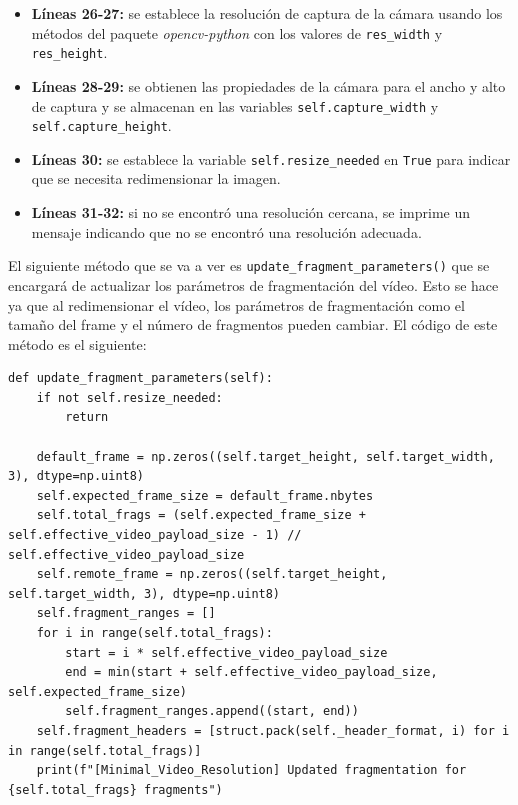 \begin{itemize}
    \item \textbf{Líneas 26-27:} se establece la resolución de captura de la cámara usando los métodos del paquete \textit{opencv-python} con los valores de \texttt{res\_width} y \texttt{res\_height}.
    \item \textbf{Líneas 28-29:} se obtienen las propiedades de la cámara para el ancho y alto de captura y se almacenan en las variables \texttt{self.capture\_width} y \texttt{self.capture\_height}.
    \item \textbf{Líneas 30:} se establece la variable \texttt{self.resize\_needed} en \texttt{True} para indicar que se necesita redimensionar la imagen.
    \item \textbf{Líneas 31-32:} si no se encontró una resolución cercana, se imprime un mensaje indicando que no se encontró una resolución adecuada.
\end{itemize}
\vspace{\baselineskip}

El siguiente método que se va a ver es \texttt{update\_fragment\_parameters()} que se encargará de actualizar los parámetros de fragmentación del vídeo. Esto se hace ya que al redimensionar el vídeo, los parámetros de fragmentación como el tamaño del frame y el número de fragmentos pueden cambiar. El código de este método es el siguiente:
\begin{lstlisting}[style=pythonstyle, caption={Método \texttt{update\_fragment\_parameters()} de \textit{Minimal\_Video\_Resolution}.}, label={lst:update_fragment_parameters_minimal_video_resolution}]
def update_fragment_parameters(self):
    if not self.resize_needed:
        return

    default_frame = np.zeros((self.target_height, self.target_width, 3), dtype=np.uint8)
    self.expected_frame_size = default_frame.nbytes
    self.total_frags = (self.expected_frame_size + self.effective_video_payload_size - 1) // self.effective_video_payload_size
    self.remote_frame = np.zeros((self.target_height, self.target_width, 3), dtype=np.uint8)
    self.fragment_ranges = []
    for i in range(self.total_frags):
        start = i * self.effective_video_payload_size
        end = min(start + self.effective_video_payload_size, self.expected_frame_size)
        self.fragment_ranges.append((start, end))
    self.fragment_headers = [struct.pack(self._header_format, i) for i in range(self.total_frags)]
    print(f"[Minimal_Video_Resolution] Updated fragmentation for {self.total_frags} fragments")
\end{lstlisting}
\vspace{\baselineskip}

